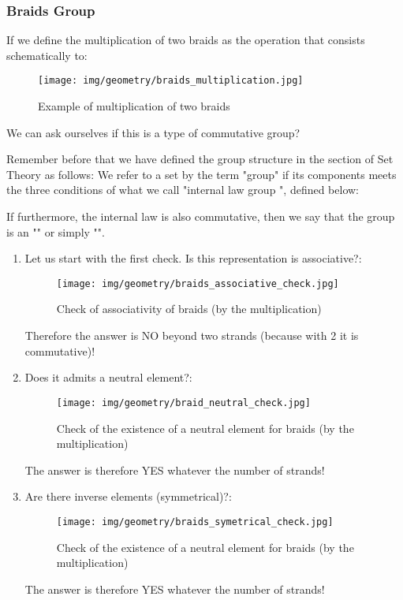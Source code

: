 {		\subsubsection{Braids Group}
		If we define the multiplication of two braids as the operation that consists schematically to:
		\begin{figure}[H]
			\centering
			\texttt{[image: img/geometry/braids\_multiplication.jpg]}
			\caption{Example of multiplication of two braids}
		\end{figure}
		We can ask ourselves if this is a type of commutative group?
		
		Remember before that we have defined the group structure in the section of Set Theory as follows: We refer to a set by the term "group" if its components meets the three conditions of what we call "internal law group ", defined below:
	
	If furthermore, the internal law is also commutative, then we say that the group is an "" or simply "".
	
	 \begin{enumerate}
	 	\item Let us start with the first check. Is this representation is associative?:
		\begin{figure}[H]
			\centering
			\texttt{[image: img/geometry/braids\_associative\_check.jpg]}
			\caption{Check of associativity of braids (by the multiplication)}
		\end{figure}
		Therefore the answer is NO beyond two strands (because with 2 it is commutative)!
		
		 \item Does it admits a neutral element?:
		 \begin{figure}[H]
			\centering
			\texttt{[image: img/geometry/braid\_neutral\_check.jpg]}
			\caption{Check of the existence of a neutral element for braids (by the multiplication)}
		\end{figure}
		The answer is therefore YES whatever the number of strands!
		
		\item Are there inverse elements (symmetrical)?:
		\begin{figure}[H]
			\centering
			\texttt{[image: img/geometry/braids\_symetrical\_check.jpg]}
			\caption{Check of the existence of a neutral element for braids (by the multiplication)}
		\end{figure}
		The answer is therefore YES whatever the number of strands!		
	 \end{enumerate}
	 
}
